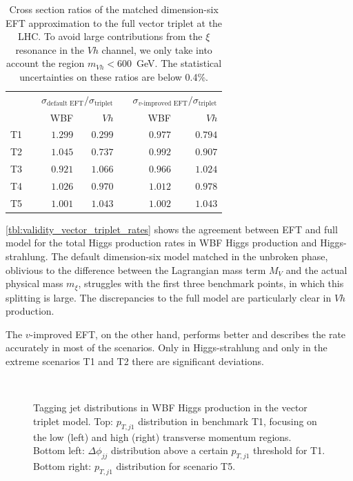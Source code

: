 \begin{table}
  \begin{tabular}{c c rr c rr}
    && \multicolumn{2}{c}{$\sigma_\text{default EFT} / \sigma_\text{triplet}$}
    && \multicolumn{2}{c}{$\sigma_\text{$v$-improved EFT} / \sigma_\text{triplet}$} \\
    \cmidrule{3-4} \cmidrule{6-7}
    && WBF & $Vh$ && WBF & $Vh$ \\
    \midrule
    T1 && $1.299$ & $0.299$ && $0.977$ & $0.794$ \\
    T2 && $1.045$ & $0.737$ && $0.992$ & $0.907$ \\
    T3 && $0.921$ & $1.066$ && $0.966$ & $1.024$ \\
    T4 && $1.026$ & $0.970$ && $1.012$ & $0.978$ \\
    T5 && $1.001$ & $1.043$ && $1.002$ & $1.043$ \\
    \bottomrule
    \end{tabular}
    \caption[Total Higgs production rates in the vector triplet model]{Cross
      section ratios of the matched dimension-six EFT
      approximation to the full vector triplet at the LHC.  To avoid large
      contributions from the $\xi$ resonance in the $Vh$ channel, we only
      take into account the region $m_{Vh} < 600$~GeV.  The statistical
      uncertainties on these ratios are below 0.4\%.}
  \label{tbl:validity_vector_triplet_rates}
\end{table}

\autoref{tbl:validity_vector_triplet_rates} shows the agreement
between EFT and full model for the total Higgs production rates in WBF
Higgs production and Higgs-strahlung. The default dimension-six model
matched in the unbroken phase, oblivious to the difference between the
Lagrangian mass term $M_V$ and the actual physical mass $m_\xi$,
struggles with the first three benchmark points, in which this
splitting is large. The discrepancies to the full model are
particularly clear in $Vh$ production.

The $v$-improved EFT, on the other hand, performs better and describes
the rate accurately in most of the scenarios. Only in Higgs-strahlung
and only in the extreme scenarios T1 and T2 there are significant
deviations. 

\begin{figure}
  \\%
  \caption{Tagging jet distributions in WBF Higgs production in the
    vector triplet model.  Top: $p_{T,j1}$ distribution in benchmark
    T1, focusing on the low (left) and high (right) transverse
    momentum regions.  Bottom left: $\Delta \phi_{jj}$ distribution
    above a certain $p_{T,j1}$ threshold for T1.  Bottom right:
    $p_{T,j1}$ distribution for scenario T5.}
  \label{fig:validity_vector_triplet_wbf}
\end{figure}

